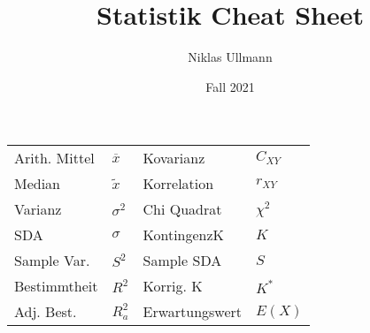 \documentclass[a4paper]{article}
\title{Statistik Cheat Sheet}
\author{Niklas Ullmann}
\date{Fall 2021}
\begin{document}
\begin{landscape}
    \thispagestyle{empty}

    \begin{multicols}{4}
        \begin{center}
            \begin{tabular}{ll|ll}
                Arith. Mittel & $\overline{x}$  & Kovarianz &  $C_{XY}$\\
                Median      & $\widetilde{x}$ &  Korrelation     & $r_{XY}$  \\
                Varianz      & $\sigma^2$ &  Chi Quadrat     &  $\chi^2$\\
                SDA      &  $\sigma$&  KontingenzK    & $K$ \\
                Sample Var.& $S^2$& Sample SDA& $S$ \\
                Bestimmtheit& $R^2$&Korrig. K& $K^*$\\
                Adj. Best. & $R^2_a$& Erwartungswert& $E(X)$
                \end{tabular}
        \end{center}

\end{multicols}
\end{landscape}
\end{document}
